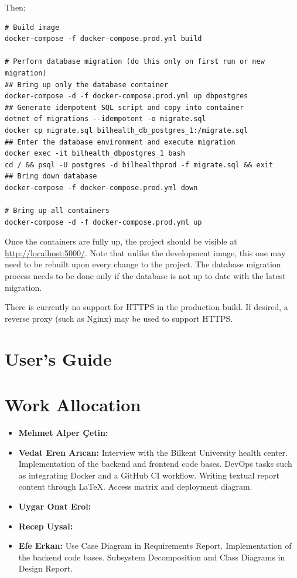 \documentclass[a4paper, 12pt, titlepage]{article}
\begin{document}
  Then;
  
  \begin{verbatim}
# Build image
docker-compose -f docker-compose.prod.yml build

# Perform database migration (do this only on first run or new migration)
## Bring up only the database container
docker-compose -d -f docker-compose.prod.yml up dbpostgres
## Generate idempotent SQL script and copy into container
dotnet ef migrations --idempotent -o migrate.sql
docker cp migrate.sql bilhealth_db_postgres_1:/migrate.sql
## Enter the database environment and execute migration
docker exec -it bilhealth_dbpostgres_1 bash
cd / && psql -U postgres -d bilhealthprod -f migrate.sql && exit
## Bring down database
docker-compose -f docker-compose.prod.yml down

# Bring up all containers
docker-compose -d -f docker-compose.prod.yml up
  \end{verbatim}
  
  Once the containers are fully up, the project should be visible at \url{http://localhost:5000/}.
  Note that unlike the development image, this one may need to be rebuilt upon every change to the project.
  The database migration process needs to be done only if the database is not up to date with the latest migration.
  
  There is currently no support for HTTPS in the production build.
  If desired, a reverse proxy (such as Nginx) may be used to support HTTPS.
  
  \pagebreak
  \section{User's Guide}

  
  
  \pagebreak
  \section{Work Allocation}
  
  \begin{itemize}
    \item \textbf{Mehmet Alper Çetin:}
    \item \textbf{Vedat Eren Arıcan:}
      Interview with the Bilkent University health center.
      Implementation of the backend and frontend code bases.
      DevOps tasks such as integrating Docker and a GitHub CI workflow.
      Writing textual report content through \LaTeX{}. Access matrix and deployment diagram.
    \item \textbf{Uygar Onat Erol:}
    \item \textbf{Recep Uysal:}
    \item \textbf{Efe Erkan:}
      Use Case Diagram in Requirements Report.
      Implementation of the backend code bases.
      Subsystem Decomposition and Class Diagrams in Design Report.
  \end{itemize}
\end{document}
